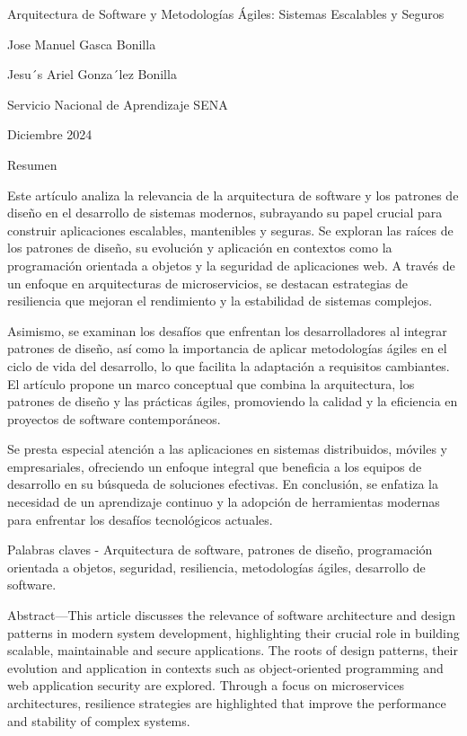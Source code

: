\documentclass[12pt]{article}
\begin{document}
Arquitectura de Software y Metodologías Ágiles: Sistemas Escalables y Seguros

Jose Manuel Gasca Bonilla

Jesu´s Ariel Gonza´lez Bonilla

Servicio Nacional de Aprendizaje SENA

Diciembre 2024

Resumen

Este artículo analiza la relevancia de la arquitectura de software y los patrones de diseño en el desarrollo de sistemas modernos, subrayando su papel crucial para construir aplicaciones escalables, mantenibles y seguras. Se exploran las raíces de los patrones de diseño, su evolución y aplicación en contextos como la programación orientada a objetos y la seguridad de aplicaciones web. A través de un enfoque en arquitecturas de microservicios, se destacan estrategias de resiliencia que mejoran el rendimiento y la estabilidad de sistemas complejos.

Asimismo, se examinan los desafíos que enfrentan los desarrolladores al integrar patrones de diseño, así como la importancia de aplicar metodologías ágiles en el ciclo de vida del desarrollo, lo que facilita la adaptación a requisitos cambiantes. El artículo propone un marco conceptual que combina la arquitectura, los patrones de diseño y las prácticas ágiles, promoviendo la calidad y la eficiencia en proyectos de software contemporáneos.

Se presta especial atención a las aplicaciones en sistemas distribuidos, móviles y empresariales, ofreciendo un enfoque integral que beneficia a los equipos de desarrollo en su búsqueda de soluciones efectivas. En conclusión, se enfatiza la necesidad de un aprendizaje continuo y la adopción de herramientas modernas para enfrentar los desafíos tecnológicos actuales.

Palabras claves - Arquitectura de software, patrones de diseño, programación orientada a objetos, seguridad, resiliencia, metodologías ágiles, desarrollo de software.

Abstract—This article discusses the relevance of software architecture and design patterns in modern system development, highlighting their crucial role in building scalable, maintainable and secure applications. The roots of design patterns, their evolution and application in contexts such as object-oriented programming and web application security are explored. Through a focus on microservices architectures, resilience strategies are highlighted that improve the performance and stability of complex systems.
\end{document}
